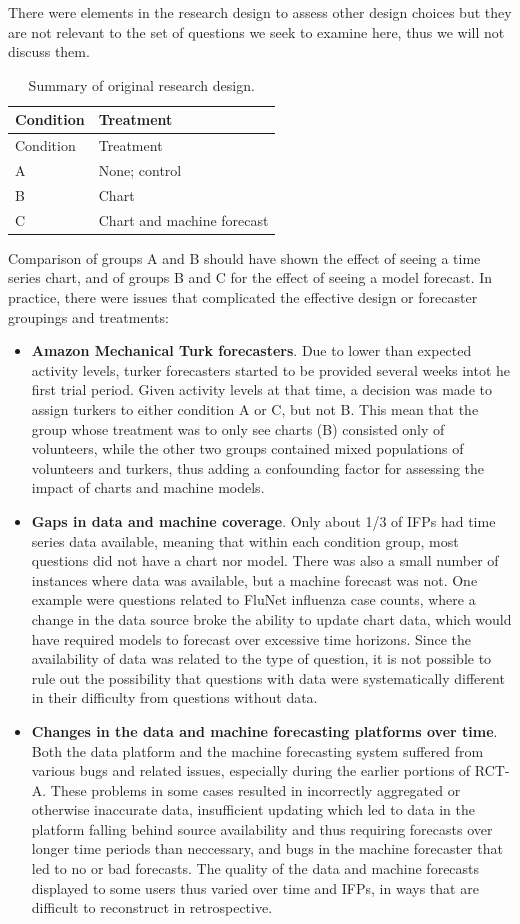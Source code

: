 \documentclass[]{article}
\providecommand{\tightlist}{%
  \setlength{\itemsep}{0pt}\setlength{\parskip}{0pt}}
\begin{document}
There were elements in the research design to assess other design
choices but they are not relevant to the set of questions we seek to
examine here, thus we will not discuss them.

\begin{longtable}[]{@{}ll@{}}
\caption{Summary of original research design.
\label{tab:original-design}}\tabularnewline
\toprule
Condition & Treatment\tabularnewline
\midrule
\endfirsthead
\toprule
Condition & Treatment\tabularnewline
\midrule
\endhead
A & None; control\tabularnewline
B & Chart\tabularnewline
C & Chart and machine forecast\tabularnewline
\bottomrule
\end{longtable}

Comparison of groups A and B should have shown the effect of seeing a
time series chart, and of groups B and C for the effect of seeing a
model forecast. In practice, there were issues that complicated the
effective design or forecaster groupings and treatments:

\begin{itemize}
\tightlist
\item
  \textbf{Amazon Mechanical Turk forecasters}. Due to lower than
  expected activity levels, turker forecasters started to be provided
  several weeks intot he first trial period. Given activity levels at
  that time, a decision was made to assign turkers to either condition A
  or C, but not B. This mean that the group whose treatment was to only
  see charts (B) consisted only of volunteers, while the other two
  groups contained mixed populations of volunteers and turkers, thus
  adding a confounding factor for assessing the impact of charts and
  machine models.
\item
  \textbf{Gaps in data and machine coverage}. Only about 1/3 of IFPs had
  time series data available, meaning that within each condition group,
  most questions did not have a chart nor model. There was also a small
  number of instances where data was available, but a machine forecast
  was not. One example were questions related to FluNet influenza case
  counts, where a change in the data source broke the ability to update
  chart data, which would have required models to forecast over
  excessive time horizons. Since the availability of data was related to
  the type of question, it is not possible to rule out the possibility
  that questions with data were systematically different in their
  difficulty from questions without data.
\item
  \textbf{Changes in the data and machine forecasting platforms over
  time}. Both the data platform and the machine forecasting system
  suffered from various bugs and related issues, especially during the
  earlier portions of RCT-A. These problems in some cases resulted in
  incorrectly aggregated or otherwise inaccurate data, insufficient
  updating which led to data in the platform falling behind source
  availability and thus requiring forecasts over longer time periods
  than neccessary, and bugs in the machine forecaster that led to no or
  bad forecasts. The quality of the data and machine forecasts displayed
  to some users thus varied over time and IFPs, in ways that are
  difficult to reconstruct in retrospective.
\end{itemize}
\end{document}
